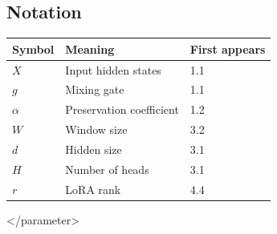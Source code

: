 \subsection{Notation}

\begin{table}[H]
\centering
\small
\begin{tabular}{lll}
\toprule
\textbf{Symbol} & \textbf{Meaning} & \textbf{First appears} \\
\midrule
$X$ & Input hidden states & 1.1 \\
$g$ & Mixing gate & 1.1 \\
$\alpha$ & Preservation coefficient & 1.2 \\
$W$ & Window size & 3.2 \\
$d$ & Hidden size & 3.1 \\
$H$ & Number of heads & 3.1 \\
$r$ & LoRA rank & 4.4 \\
\bottomrule
\end{tabular}
\end{table}
</parameter>

